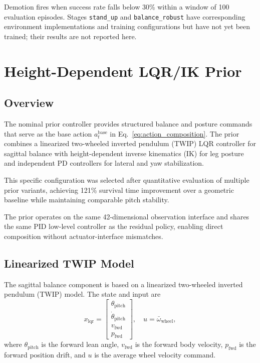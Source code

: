 \documentclass[conference]{IEEEtran}
\begin{document}
Demotion fires when success rate falls below 30\% within a window
of 100 evaluation episodes.
Stages \texttt{stand\_up} and \texttt{balance\_robust} have corresponding
environment implementations and training configurations
but have not yet been trained; their results are not reported here.

\section{Height-Dependent LQR/IK Prior}
\label{sec:lqr_ik_prior}

\subsection{Overview}
The nominal prior controller provides structured balance and posture
commands that serve as the base action $a_t^{\mathrm{base}}$ in
Eq.~\eqref{eq:action_composition}.
The prior combines a linearized two-wheeled inverted pendulum (TWIP)
LQR controller for sagittal balance with height-dependent inverse
kinematics (IK) for leg posture and independent PD controllers for
lateral and yaw stabilization.

This specific configuration was selected after quantitative evaluation
of multiple prior variants, achieving 121\% survival time improvement
over a geometric baseline while maintaining comparable pitch stability.

The prior operates on the same 42-dimensional observation interface
and shares the same PID low-level controller as the residual policy,
enabling direct composition without actuator-interface mismatches.

\subsection{Linearized TWIP Model}
The sagittal balance component is based on a linearized
two-wheeled inverted pendulum (TWIP) model.
The state and input are
\begin{equation}
x_{\mathrm{lqr}} =
\begin{bmatrix}
\theta_{\mathrm{pitch}} \\
\dot{\theta}_{\mathrm{pitch}} \\
v_{\mathrm{fwd}} \\
p_{\mathrm{fwd}}
\end{bmatrix},
\quad
u = \bar{\omega}_{\mathrm{wheel}},
\end{equation}
where $\theta_{\mathrm{pitch}}$ is the forward lean angle,
$v_{\mathrm{fwd}}$ is the forward body velocity,
$p_{\mathrm{fwd}}$ is the forward position drift,
and $u$ is the average wheel velocity command.
\end{document}
